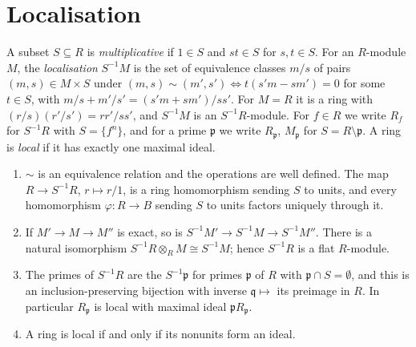 \section{Localisation}\label{commutative-algebra:section-localisation}

\begin{definition}\label{commutative-algebra:definition-localisation}
A subset $S \subseteq R$ is \emph{multiplicative} if $1 \in S$ and $st \in S$ for $s, t \in S$. For an $R$-module $M$, the
\emph{localisation} $S^{-1}M$ is the set of equivalence classes $m/s$ of pairs $(m, s) \in M \times S$ under
$(m, s) \sim (m', s') \iff t(s'm - sm') = 0$ for some $t \in S$, with $m/s + m'/s' = (s'm + sm')/ss'$. For $M = R$ it is a
ring with $(r/s)(r'/s') = rr'/ss'$, and $S^{-1}M$ is an $S^{-1}R$-module. For $f \in R$ we write $R_f$ for
$S^{-1}R$ with $S = \{f^n\}$, and for a prime $\mathfrak{p}$ we write $R_\mathfrak{p}$, $M_\mathfrak{p}$ for $S = R \setminus \mathfrak{p}$.
A ring is \emph{local} if it has exactly one maximal ideal.
\end{definition}

\begin{proposition}\label{commutative-algebra:proposition-localisation}
\begin{enumerate}
\item $\sim$ is an equivalence relation and the operations are well defined. The map $R \to S^{-1}R$,
$r \mapsto r/1$, is a ring homomorphism sending $S$ to units, and every homomorphism $\varphi \colon R \to B$ sending $S$ to
units factors uniquely through it.
\item If $M' \to M \to M''$ is exact, so is $S^{-1}M' \to S^{-1}M \to S^{-1}M''$. There is a natural isomorphism
$S^{-1}R \otimes_R M \cong S^{-1}M$; hence $S^{-1}R$ is a flat $R$-module.
\item The primes of $S^{-1}R$ are the $S^{-1}\mathfrak{p}$ for primes $\mathfrak{p}$ of $R$ with $\mathfrak{p} \cap S = \emptyset$, and this is an
inclusion-preserving bijection with inverse $\mathfrak{q} \mapsto$ its preimage in $R$. In particular $R_\mathfrak{p}$ is local with
maximal ideal $\mathfrak{p}R_\mathfrak{p}$.
\item A ring is local if and only if its nonunits form an ideal.
\end{enumerate}
\end{proposition}

